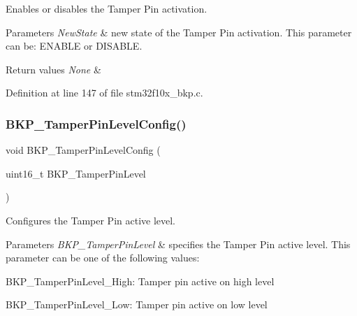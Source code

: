 Enables or disables the Tamper Pin activation. 


\begin{DoxyParams}{Parameters}
{\em New\+State} & new state of the Tamper Pin activation. This parameter can be\+: E\+N\+A\+B\+LE or D\+I\+S\+A\+B\+LE. \\
\hline
\end{DoxyParams}

\begin{DoxyRetVals}{Return values}
{\em None} & \\
\hline
\end{DoxyRetVals}


Definition at line 147 of file stm32f10x\+\_\+bkp.\+c.

\mbox{\label{group___b_k_p___private___functions_gae216446d641d075fb575ce6dbe2ff4c1}} 
\subsubsection{\texorpdfstring{B\+K\+P\+\_\+\+Tamper\+Pin\+Level\+Config()}{BKP\_TamperPinLevelConfig()}}
{\footnotesize\ttfamily void B\+K\+P\+\_\+\+Tamper\+Pin\+Level\+Config (\begin{DoxyParamCaption}\item[{uint16\+\_\+t}]{B\+K\+P\+\_\+\+Tamper\+Pin\+Level }\end{DoxyParamCaption})}



Configures the Tamper Pin active level. 


\begin{DoxyParams}{Parameters}
{\em B\+K\+P\+\_\+\+Tamper\+Pin\+Level} & specifies the Tamper Pin active level. This parameter can be one of the following values\+: \begin{DoxyItemize}
\item B\+K\+P\+\_\+\+Tamper\+Pin\+Level\+\_\+\+High\+: Tamper pin active on high level \item B\+K\+P\+\_\+\+Tamper\+Pin\+Level\+\_\+\+Low\+: Tamper pin active on low level \end{DoxyItemize}
\\
\hline
\end{DoxyParams}

